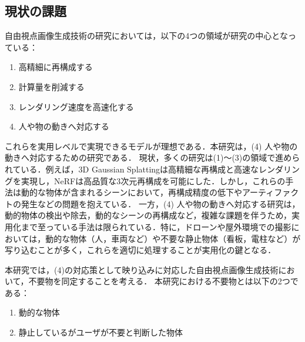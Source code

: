 \documentclass[a4paper,dvipdfmx,ja=standard,9pt]{bxjsarticle}
\begin{document}
\subsection{現状の課題}
自由視点画像生成技術の研究においては，以下の4つの領域が研究の中心となっている：
\begin{enumerate}[label=(\arabic*)]
\item 高精細に再構成する\cite{kerbl3Dgaussians,lin2024vastgaussian,liu2025citygaussian,mildenhall2020nerfrepresentingscenesneural,barron2022mipnerf360}
\item 計算量を削減する\cite{kerbl3Dgaussians,lin2024vastgaussian,chen2022tensorf}
\item レンダリング速度を高速化する\cite{kerbl3Dgaussians,muller2022instant,yu_and_fridovichkeil2021plenoxels}
\item 人や物の動きへ対応する\cite{tang2025dronesplat3dgaussiansplatting}
\end{enumerate}
これらを実用レベルで実現できるモデルが理想である．本研究は，(4) 人や物の動きへ対応するための研究である．
現状，多くの研究は(1)〜(3)の領域で進められている．例えば，3D Gaussian Splatting\cite{kerbl3Dgaussians}は高精細な再構成と高速なレンダリングを実現し，NeRF\cite{mildenhall2020nerfrepresentingscenesneural}は高品質な3次元再構成を可能にした．しかし，これらの手法は動的な物体が含まれるシーンにおいて，再構成精度の低下やアーティファクトの発生などの問題を抱えている．
一方，(4) 人や物の動きへ対応する研究は，動的物体の検出や除去，動的なシーンの再構成など，複雑な課題を伴うため，実用化まで至っている手法は限られている．特に，ドローンや屋外環境での撮影においては，動的な物体（人，車両など）や不要な静止物体（看板，電柱など）が写り込むことが多く，これらを適切に処理することが実用化の鍵となる．

本研究では，(4)の対応策として映り込みに対応した自由視点画像生成技術において，不要物を同定することを考える．
本研究における不要物とは以下の2つである：
\begin{enumerate}[label=(\arabic*)]
\item 動的な物体
\item 静止しているがユーザが不要と判断した物体
\end{enumerate}
\end{document}
